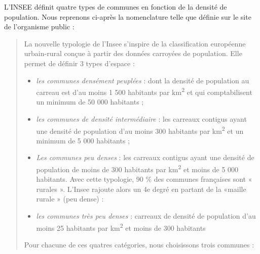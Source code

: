 \documentclass{book}
\begin{document}
L'INSEE définit quatre types de communes en fonction de la densité de population. Nous reprenons ci-après la nomenclature telle que définie sur le
site de l'organisme public :\\
\begin{quotation}

\Large{
La nouvelle typologie de l’Insee s’inspire de la classification européenne urbain-rural conçue à partir des données carroyées de population. 
Elle permet de définir 3 types d’espace :\\

\begin{itemize}
\item \emph{les communes densément peuplées} : dont la densité de population au carreau est d’au moins 1 500 habitants par km\textsuperscript{2} 
et qui comptabilisent un minimum de 50 000 habitants ;

\item \emph{les communes de densité intermédiaire} : les carreaux contigus ayant une densité de population d’au moins 300 habitants par km\textsuperscript{2} 
et un minimum de 5 000 habitants ;

\item \emph{Les communes peu denses} : les carreaux contigus ayant une densité de population de moins de 300 habitants par km\textsuperscript{2} et moins de 5 000 habitants.
Avec cette typologie, 90 \% des communes françaises sont « rurales ». L’Insee rajoute alors un 4e degré en partant de la «maille rurale » (peu dense) :

\item \emph{les communes très peu denses} : carreaux de densité de population d’au moins 25 habitants par km\textsuperscript{2} et moins de 300 habitants
\end{itemize}
}

Pour chacune de ces quatres catégories, nous choisissons trois communes :


\end{quotation}

\backmatter

\listoftables

\listoffigures



\end{document}
